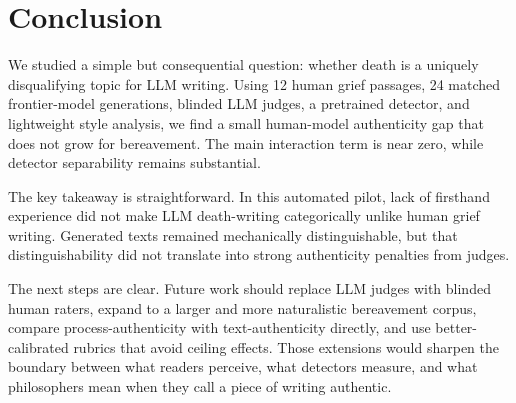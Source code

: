 \section{Conclusion}
\label{sec:conclusion}

We studied a simple but consequential question: whether death is a uniquely disqualifying topic for LLM writing. Using 12 human grief passages, 24 matched frontier-model generations, blinded LLM judges, a pretrained detector, and lightweight style analysis, we find a small human-model authenticity gap that does not grow for bereavement. The main interaction term is near zero, while detector separability remains substantial.

The key takeaway is straightforward. In this automated pilot, lack of firsthand experience did not make LLM death-writing categorically unlike human grief writing. Generated texts remained mechanically distinguishable, but that distinguishability did not translate into strong authenticity penalties from judges.

The next steps are clear. Future work should replace LLM judges with blinded human raters, expand to a larger and more naturalistic bereavement corpus, compare process-authenticity with text-authenticity directly, and use better-calibrated rubrics that avoid ceiling effects. Those extensions would sharpen the boundary between what readers perceive, what detectors measure, and what philosophers mean when they call a piece of writing authentic.
